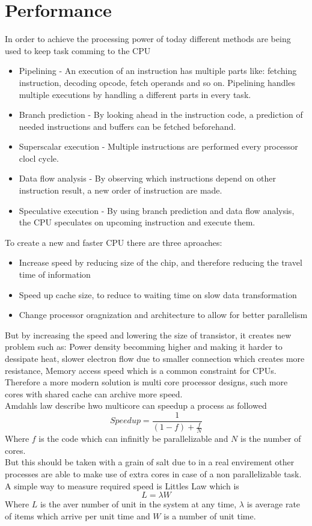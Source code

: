 \documentclass[12pt, a4paper]{article}
\begin{document}
	\section{Performance}
		In order to achieve the processing power of today different methods are being used to keep task comming to the CPU
		\begin{itemize}
			\item Pipelining  - An execution of an instruction has multiple parts like: fetching instruction, decoding opcode, fetch operands and so on. Pipelining handles multiple executions by handling a different parts in every task.
			\item Branch prediction - By looking ahead in the instruction code, a prediction of needed instructions and buffers can be fetched beforehand.
			\item Superscalar execution - Multiple instructions are performed every processor clocl cycle.
			\item Data flow analysis - By observing which instructions depend on other instruction result, a new order of instruction are made.
			\item Speculative execution - By using branch prediction and data flow analysis, the CPU speculates on upcoming instruction and execute them.
		\end{itemize}
		To create a new and faster CPU there are three aproaches:
		\begin{itemize}
			\item Increase speed by reducing size of the chip, and therefore reducing the travel time of information
			\item Speed up cache size, to reduce to waiting time on slow data transformation
			\item Change processor oragnization and architecture to allow for better parallelism
		\end{itemize}
		But by increasing the speed and lowering the size of transistor, it creates new problem such as: Power density becomming higher and making it harder to dessipate heat, slower electron flow due to smaller connection which creates more resistance, Memory access speed which is a common constraint for CPUs.\\
		Therefore a more modern solution is multi core processor designs, such more cores with shared cache can archive more speed.\\
		Amdahls law describe hwo multicore can speedup a process as followed
		$$Speedup = \frac{1}{(1-f)+\frac{f}{N}}$$
		Where $f$ is the code which can infinitly be parallelizable and $N$ is the number of cores.\\
		But this should be taken with a grain of salt due to in a real envirement other processes are able to make use of extra cores in case of a non parallelizable task.\\
		A simple way to measure required speed is Littles Law which is 
		$$L=\lambda W$$
		Where $L$ is the aver number of unit in the system at any time, $\lambda$ is average rate of items which arrive per unit time and $W$ is a number of unit time.
\end{document}
